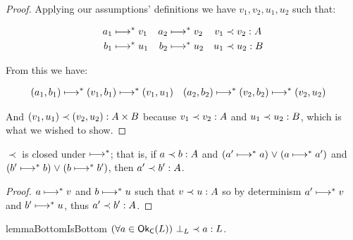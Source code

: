 \begin{proof}
  Applying our assumptions' definitions we have $v_1,v_2,u_1,u_2$ such that:

  \begin{align*}
    a_1 &\evalsto v_1
    &
    a_2 &\evalsto v_2
    &
    v_1 &\prec v_2 : A
    \\
    b_1 &\evalsto u_1
    &
    b_2 &\evalsto u_2
    &
    u_1 &\prec u_2 : B
  \end{align*}

  \noindent
  From this we have:

  \begin{align*}
    \etuple{a_1, b_1} \evalsto \etuple{v_1, b_1} &\evalsto \etuple{v_1, u_1}
    &
    \etuple{a_2, b_2} \evalsto \etuple{v_2, b_2} &\evalsto \etuple{v_2, u_2}
  \end{align*}

  \noindent
  And $\oplrvalue{A \times B}{\etuple{v_1, u_1}}{\etuple{v_2, u_2}}$ because $\oplrvalue A {v_1} {v_2}$ and $\oplrvalue B {u_1} {u_2}$, which is what we wished to show.
\end{proof}

\begin{lemma}
  $\prec$ is closed under $\evalsto$; that is, if $\oplrclosed A a b$ and $(a' \evalsto a) \vee (a \evalsto a')$ and $(b' \evalsto b) \vee (b \evalsto b')$, then $\oplrclosed A {a'} {b'}$.
\end{lemma}

\begin{proof}
  $a \evalsto v$ and $b \evalsto u$ such that $\oplrvalue A v u$ so by determinism $a' \evalsto v$ and $b' \evalsto u$, thus $\oplrclosed A {a'}{b'}$.
\end{proof}


\begin{restatable}{lemma}{BottomIsBottom}
  $\fa{a \in \goodclosed L} \oplrclosed{L}{\bot_L} a$.
\end{restatable}

